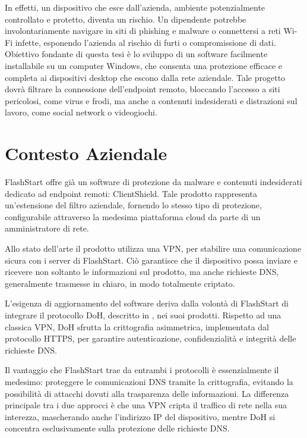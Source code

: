 \documentclass[12pt,a4paper,openright,twoside]{book}
\begin{document}
In effetti, un dispositivo che esce dall'azienda, ambiente potenzialmente controllato e protetto, diventa un rischio.
Un dipendente potrebbe involontariamente navigare in siti di phishing e malware o connettersi a reti Wi-Fi infette, esponendo l'azienda al rischio di furti o compromissione di dati.
Obiettivo fondante di questa tesi è lo sviluppo di un software facilmente installabile su un computer Windows, che consenta una protezione efficace e completa ai dispositivi desktop che escono dalla rete aziendale.
Tale progetto dovrà filtrare la connessione dell'endpoint remoto, bloccando l'accesso a siti pericolosi, come virus e frodi, ma anche a contenuti indesiderati e distrazioni sul lavoro, come social network o videogiochi.

\section{Contesto Aziendale}

FlashStart offre già un software di protezione da malware e contenuti indesiderati dedicato ad endpoint remoti: ClientShield.
Tale prodotto rappresenta un'estensione del filtro aziendale, fornendo lo stesso tipo di protezione, configurabile attraverso la medesima piattaforma cloud da parte di un amministratore di rete.

Allo stato dell'arte il prodotto utilizza una \gls{VPN}, per stabilire una comunicazione sicura con i server di FlashStart.
Ciò garantisce che il dispositivo possa inviare e ricevere non soltanto le informazioni sul prodotto, ma anche richieste \gls{DNS}, generalmente trasmesse in chiaro, in modo totalmente criptato.

L'esigenza di aggiornamento del software deriva dalla volontà di FlashStart di integrare il protocollo \gls{DoH}, descritto in \cite{RFC8484}, nei suoi prodotti.
Rispetto ad una classica \gls{VPN}, \gls{DoH} sfrutta la crittografia asimmetrica, implementata dal protocollo \gls{HTTPS}, per garantire autenticazione, confidenzialità e integrità delle richieste \gls{DNS}.

Il vantaggio che FlashStart trae da entrambi i protocolli è essenzialmente il medesimo: proteggere le comunicazioni \gls{DNS} tramite la crittografia, evitando la possibilità di attacchi dovuti alla trasparenza delle informazioni.
La differenza principale tra i due approcci è che una \gls{VPN} cripta il traffico di rete nella sua interezza, mascherando anche l'indirizzo IP del dispositivo, mentre \gls{DoH} si concentra esclusivamente sulla protezione delle richieste \gls{DNS}.
\end{document}
